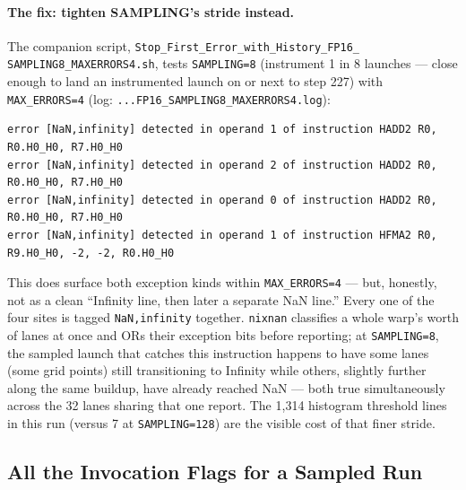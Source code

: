 \documentclass[11pt]{article}
\begin{document}
\paragraph{The fix: tighten SAMPLING's stride instead.} The companion script,
\texttt{Stop\_First\_Error\_\allowbreak with\_History\_\allowbreak FP16\_\allowbreak
SAMPLING8\_\allowbreak MAXERRORS4.sh}, tests \texttt{SAMPLING=8} (instrument 1 in 8
launches --- close enough to land an instrumented launch on or next to step 227) with
\texttt{MAX\_ERRORS=4} (log: \texttt{...FP16\_SAMPLING8\_MAXERRORS4.log}):
\begin{lstlisting}[basicstyle=\ttfamily\scriptsize]
error [NaN,infinity] detected in operand 1 of instruction HADD2 R0, R0.H0_H0, R7.H0_H0
error [NaN,infinity] detected in operand 2 of instruction HADD2 R0, R0.H0_H0, R7.H0_H0
error [NaN,infinity] detected in operand 0 of instruction HADD2 R0, R0.H0_H0, R7.H0_H0
error [NaN,infinity] detected in operand 1 of instruction HFMA2 R0, R9.H0_H0, -2, -2, R0.H0_H0
\end{lstlisting}
This does surface both exception kinds within \texttt{MAX\_ERRORS=4} --- but, honestly,
not as a clean ``Infinity line, then later a separate NaN line.'' Every one of the four
sites is tagged \texttt{NaN,infinity} together. \texttt{nixnan} classifies a whole warp's
worth of lanes at once and ORs their exception bits before reporting; at
\texttt{SAMPLING=8}, the sampled launch that catches this instruction happens to have
some lanes (some grid points) still transitioning to Infinity while others, slightly
further along the same buildup, have already reached NaN --- both true simultaneously
across the 32 lanes sharing that one report. The 1{,}314 histogram threshold lines in
this run (versus 7 at \texttt{SAMPLING=128}) are the visible cost of that finer stride.

\subsection{All the Invocation Flags for a Sampled Run}
\end{document}
